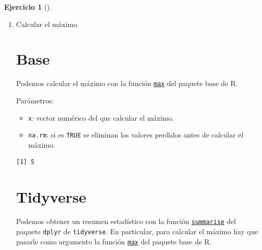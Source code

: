 \documentclass[
  a4paper,
]{scrreport}
\newenvironment{Shaded}{\begin{snugshade}}{\end{snugshade}}
\newcommand{\FunctionTok}[1]{\textcolor[rgb]{0.28,0.35,0.67}{#1}}
\newcommand{\NormalTok}[1]{\textcolor[rgb]{0.00,0.23,0.31}{#1}}
\newcommand{\SpecialCharTok}[1]{\textcolor[rgb]{0.37,0.37,0.37}{#1}}
\providecommand{\tightlist}{%
  \setlength{\itemsep}{0pt}\setlength{\parskip}{0pt}}\usepackage{longtable,booktabs,array}
\theoremstyle{definition}
\newtheorem{exercise}{Ejercicio}[chapter]
\theoremstyle{remark}
\begin{document}
\begin{exercise}[]
\begin{enumerate}
\begin{tcolorbox}
  \end{tcolorbox}
\item
  Calcular el máximo.

  \begin{tcolorbox}[enhanced jigsaw, colframe=quarto-callout-tip-color-frame, toprule=.15mm, bottomtitle=1mm, breakable, opacitybacktitle=0.6, toptitle=1mm, colback=white, bottomrule=.15mm, title=\textcolor{quarto-callout-tip-color}{\faLightbulb}\hspace{0.5em}{Solución}, arc=.35mm, left=2mm, titlerule=0mm, rightrule=.15mm, coltitle=black, leftrule=.75mm, opacityback=0, colbacktitle=quarto-callout-tip-color!10!white]

  \section{Base}

  Podemos calcular el máximo con la función
  \href{https://www.rdocumentation.org/packages/base/versions/3.6.2/topics/max}{\texttt{max}}
  del paquete base de R.

  Parámetros:

  \begin{itemize}
  \tightlist
  \item
    \texttt{x}: vector numérico del que calcular el máximo.
  \item
    \texttt{na.rm}: si es \texttt{TRUE} se eliminan los valores perdidos
    antes de calcular el máximo.
  \end{itemize}

\begin{Shaded}
\end{Shaded}

\begin{verbatim}
[1] 5
\end{verbatim}

  \section{Tidyverse}

  Podemos obtener un resumen estadístico con la función
  \href{https://dplyr.tidyverse.org/reference/summarise.html}{\texttt{summarise}}
  del paquete \texttt{dplyr} de \texttt{tidyverse}. En particular, para
  calcular el máximo hay que pasarle como argumento la función
  \href{https://www.rdocumentation.org/packages/base/versions/3.6.2/topics/max}{\texttt{max}}
  del paquete base de R.


\end{tcolorbox}
\end{enumerate}
\end{exercise}
\end{document}
